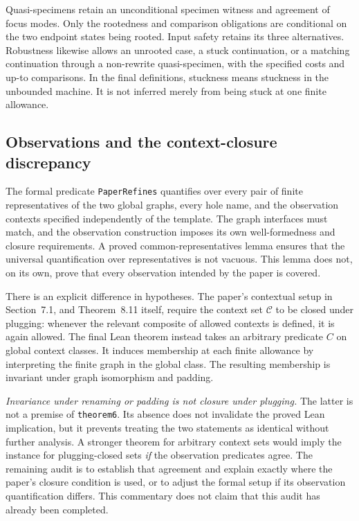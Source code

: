 Quasi-specimens retain an unconditional specimen witness and agreement of
focus modes. Only the rootedness and comparison obligations are conditional
on the two endpoint states being rooted. Input safety retains its three
alternatives. Robustness likewise allows an unrooted case, a stuck continuation,
or a matching continuation through a non-rewrite quasi-specimen, with the
specified costs and up-to comparisons. In the final definitions, stuckness
means stuckness in the unbounded machine. It is not inferred merely from
being stuck at one finite allowance.

\subsection{Observations and the context-closure discrepancy}
\label{sec:context-correspondence-audit}

The formal predicate \texttt{PaperRefines} quantifies over every pair of finite
representatives of the two global graphs, every hole name, and the observation
contexts specified independently of the template. The graph interfaces must
match, and the observation construction imposes its own well-formedness and
closure requirements. A proved common-representatives lemma ensures that the
universal quantification over representatives is not vacuous. This lemma does
not, on its own, prove that every observation intended by the paper is covered.

There is an explicit difference in hypotheses. The paper's contextual setup
in Section~7.1, and Theorem~8.11 itself, require the context set $\mathcal C$
to be closed under plugging: whenever the relevant composite of allowed
contexts is defined, it is again allowed. The final Lean theorem instead
takes an arbitrary predicate $C$ on global context classes. It induces
membership at each finite allowance by interpreting the finite graph in the
global class. The resulting membership is invariant under graph isomorphism
and padding.

\emph{Invariance under renaming or padding is not closure under plugging.}
The latter is not a premise of \texttt{theorem6}. Its absence does not invalidate
the proved Lean implication, but it prevents treating the two statements as
identical without further analysis. A stronger theorem for arbitrary context
sets would imply the instance for plugging-closed sets \emph{if} the observation
predicates agree. The remaining audit is to establish that agreement and
explain exactly where the paper's closure condition is used, or to adjust the
formal setup if its observation quantification differs. This commentary does
not claim that this audit has already been completed.

